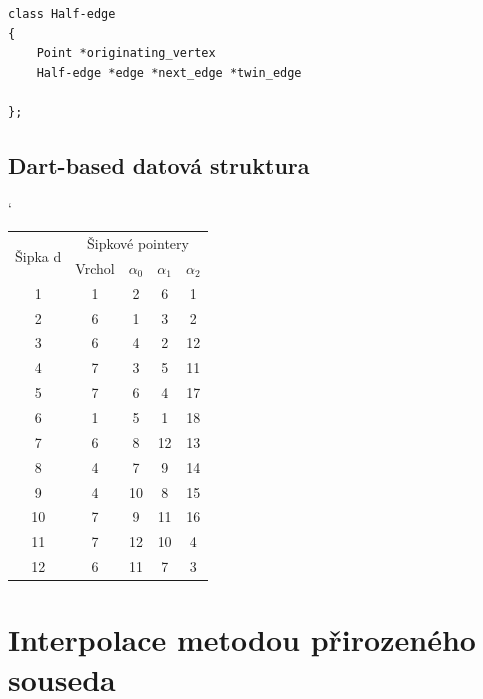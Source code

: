 \documentclass[12pt,a4paper]{article}
\begin{document}
\bigskip
\begin{lstlisting}[caption={Definice datové struktury}]
class Half-edge
{
	Point *originating_vertex
	Half-edge *edge *next_edge *twin_edge
	
};
\end{lstlisting}

\newpage
\subsection{Dart-based datová struktura}


\begin{table}[h]
\catcode`
\begin{tabular}{|c||c|c|c|c|}
\hline
\multirow{2}{*}{Šipka d} & \multicolumn{4}{c|}{Šipkové pointery} \\ \cline{2-5} 
                         & Vrchol &$\alpha_0$ & $\alpha_1$ & $\alpha_2$      \\ \hline
1                        & 1          & 2      & 6      & 1      \\ \hline
2                        & 6          & 1      & 3      & 2      \\ \hline
3                        & 6          & 4      & 2      & 12     \\ \hline
4                        & 7          & 3      & 5      & 11     \\ \hline
5                        & 7          & 6      & 4      & 17     \\ \hline
6                        & 1          & 5      & 1      & 18     \\ \hline
7                        & 6          & 8      & 12     & 13     \\ \hline
8                        & 4          & 7      & 9      & 14     \\ \hline
9                        & 4          & 10     & 8      & 15     \\ \hline
10                       & 7          & 9      & 11     & 16     \\ \hline
11                       & 7          & 12     & 10     & 4      \\ \hline
12                       & 6          & 11     & 7      & 3      \\ \hline
\end{tabular}
\end{table}

\newpage
\section{Interpolace metodou přirozeného souseda}
\end{document}
